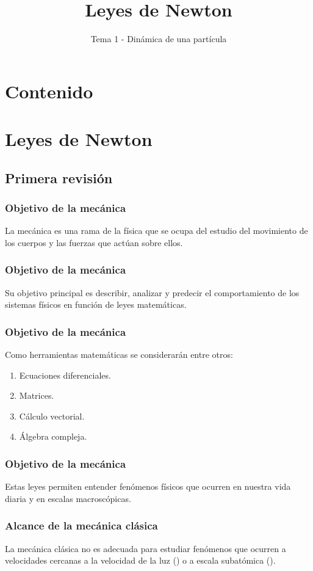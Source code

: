 \documentclass[12pt]{beamer}
\title{Leyes de Newton}
\subtitle{Tema 1 - Dinámica de una partícula}
\begin{document}
\fontsize{14}{14}\selectfont
{}
\maketitle

\section*{Contenido}

\section{Leyes de Newton}
\subsection{Primera revisión}

\begin{frame}
\frametitle{Objetivo de la mecánica}
La mecánica es una rama de la física que se ocupa del estudio del movimiento de los cuerpos y las fuerzas que actúan sobre ellos.
\end{frame}
\begin{frame}
\frametitle{Objetivo de la mecánica}
Su objetivo principal es describir, analizar y predecir el comportamiento de los sistemas físicos en función de leyes matemáticas.
\end{frame}
\begin{frame}
\frametitle{Objetivo de la mecánica}
Como herramientas matemáticas se considerarán entre otros:
\begin{enumerate}
\item Ecuaciones diferenciales.
\item Matrices.
\item Cálculo vectorial.
\item Álgebra compleja.
\end{enumerate}
\end{frame}
\begin{frame}
\frametitle{Objetivo de la mecánica}
Estas leyes permiten entender fenómenos físicos que ocurren en nuestra vida diaria y en escalas macroscópicas.
\end{frame}
\begin{frame}
\frametitle{Alcance de la mecánica clásica}
La mecánica clásica no es adecuada para estudiar fenómenos que ocurren a velocidades cercanas a la velocidad de la luz () \pause o a escala subatómica ().
\end{frame}
\end{document}
